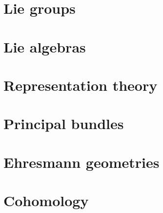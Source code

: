 \documentclass[12pt,a4paper]{report}
\theoremstyle{definition}
\theoremstyle{Theorem}
\theoremstyle{break}
\theoremstyle{definition}
\begin{document}
	\chapter{Lie groups}
	\chapter{Lie algebras}
	\chapter{Representation theory}
	\chapter{Principal bundles}
	\chapter{Ehresmann geometries}
	\chapter{Cohomology}
\end{document}
